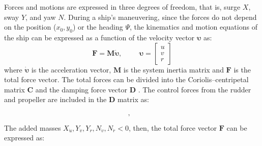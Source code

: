 Forces and motions are expressed in three degrees of freedom, that is, surge $X$, sway $Y$, and yaw $N$. During a ship's maneuvering, since the forces do not depend on the position ($x_0,y_0$) or the heading $\Psi$, the kinematics and motion equations of the ship can be expressed as a function of the velocity vector $\pmb{\bm{\upsilon}}$ as:
\begin{equation}
    \label{eq:eom}
    \mathbf{F} = \mathbf{M}  \pmb{\bm{\dot{\upsilon}}}, \hspace{1cm}
    \pmb{\bm{\upsilon}} = \left[\begin{matrix}u\\v\\r\end{matrix}\right]
\end{equation}
where $\pmb{\bm{\dot{\upsilon}}}$ is the acceleration vector, $\mathbf{M}$ is the system inertia matrix and $\mathbf{F}$ is the total force vector.
The total forces can be divided into the Coriolis–centripetal matrix $\mathbf{C}$ and the damping force vector $\mathbf{D}$ \citep{fossenHandbookMarineCraft2011}. The control forces from the rudder and propeller are included in the $\mathbf{D}$ matrix as:
\begin{equation}
    \label{eq:C_expanded}
    , \hspace{0.3cm}
    
\end{equation}
%     
The added masses  $X_{\dot{u}},Y_{\dot{v}},Y_{\dot{r}},N_{\dot{v}},N_{\dot{r}} < 0$, then, the total force vector $\mathbf{F}$ can be expressed as:
